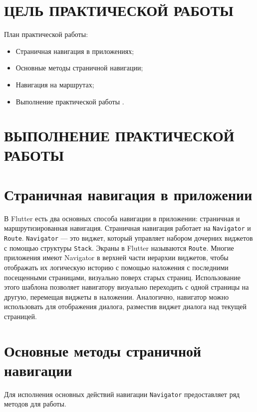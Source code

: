 \section*{ЦЕЛЬ ПРАКТИЧЕСКОЙ РАБОТЫ}

План практической работы:

\begin{itemize}
	\item Страничная навигация в приложениях;
	\item Основные методы страничной навигации;
	\item Навигация на маршрутах;
	\item Выполнение практической работы .
\end{itemize}

\clearpage

\section*{ВЫПОЛНЕНИЕ ПРАКТИЧЕСКОЙ РАБОТЫ}

\section{Страничная навигация в приложении}

В Flutter есть два основных способа навигации в приложении:
страничная и маршрутизированная навигация.
Страничная навигация работает на \texttt{Navigator} и \texttt{Route}.
\texttt{Navigator} --- это виджет, который управляет набором дочерних виджетов
с помощью структуры \texttt{Stack}.
Экраны в Flutter называются \texttt{Route}.
Многие приложения имеют Navigator в верхней части иерархии виджетов,
чтобы отображать их логическую историю с помощью наложения
с последними посещенными страницами, визуально поверх старых страниц.
Использование этого шаблона позволяет навигатору визуально переходить
с одной страницы на другую, перемещая виджеты в наложении.
Аналогично, навигатор можно использовать для отображения диалога,
разместив виджет диалога над текущей страницей.

\section{Основные методы страничной навигации}

Для исполнения основных действий навигации \texttt{Navigator} 
предоставляет ряд методов для работы.

